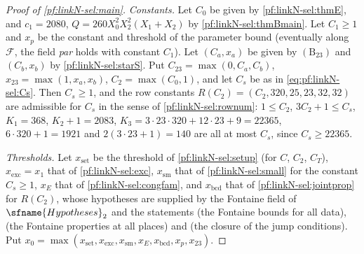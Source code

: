 \begin{proof}[Proof of \cref{pf:linkN-sel:main}]
\emph{Constants.} Let $C_0$ be given by \cref{pf:linkN-sel:thmE}, and $c_1=2080$, $Q=260X_0^2X_2^2(X_1+X_2)$ by \cref{pf:linkN-sel:thmBmain}. Let
$C_1\ge1$ and $x_p$ be the constant and threshold of the parameter bound 
(eventually along $\mathcal F$, the field \emph{par} holds with constant $C_1$). Let $(C_a,x_a)$ be given by $(\mathrm B_{23})$ and $(C_b,x_b)$ by
\cref{pf:linkN-sel:starS}. Put $C_{23}=\max(0,C_a,C_b)$, $x_{23}=\max(1,x_a,x_b)$, $C_2=\max(C_0,1)$, and let $C_s$ be as in \eqref{eq:pf:linkN-sel:Cs}.
Then $C_s\ge1$, and the row constants $R(C_2)=(C_2,320,25,23,32,32)$ are admissible for $C_s$ in the sense of \cref{pf:linkN-sel:rownum}: $1\le C_2$,
$3C_2+1\le C_s$, $K_1=368$, $K_2+1=2083$, $K_3=3\cdot23\cdot320+12\cdot23+9=22365$, $6\cdot320+1=1921$ and $2(3\cdot23+1)=140$ are all at most
$C_s$, since $C_s\ge22365$.

\emph{Thresholds.} Let $x_{\mathrm{set}}$ be the threshold of \cref{pf:linkN-sel:setup} (for $C$, $C_2$, $C_T$), $x_{\mathrm{exc}}=x_1$ that of
\cref{pf:linkN-sel:exc}, $x_{\mathrm{sm}}$ that of \cref{pf:linkN-sel:small} for the constant $C_s\ge1$, $x_E$ that of \cref{pf:linkN-sel:congfam}, and
$x_{\mathrm{bcd}}$ that of \cref{pf:linkN-sel:jointprop} for $R(C_2)$, whose hypotheses are supplied by the Fontaine field of
$\sfname{Hypotheses}_2$ and the statements  (the Fontaine bounds for all data),
 (the Fontaine properties at all places) and
 (the closure of the jump conditions). Put
$x_0=\max(x_{\mathrm{set}},x_{\mathrm{exc}},x_{\mathrm{sm}},x_E,x_{\mathrm{bcd}},x_p,x_{23})$.


\end{proof}
